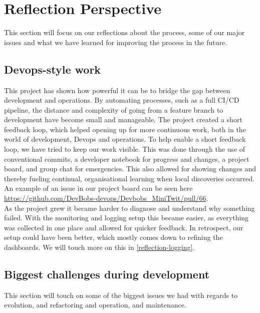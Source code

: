 \section{Reflection Perspective}\label{reflection-perspective}

This section will focus on our reflections about the process, some of
our major issues and what we have learned for improving the process in
the future.

\subsection{Devops-style work}
This project has shown how powerful it can be to bridge the gap between development and operations.
By automating processes, such as a full CI/CD pipeline, the distance and complexity of going from a feature branch to development have become small and manageable.
The project created a short feedback loop, which helped opening up for more continuous work, both in the world of development, Devops and operations.
To help enable a short feedback loop, we have tried to keep our work visible. 
This was done through the use of conventional commits, a developer notebook for progress and changes, a project board, and group chat for emergencies.
This also allowed for showing changes and thereby fueling continual, organisational learning when local discoveries occurred. 
An example of an issue in our project board can be seen here \url{https://github.com/DevBobs-devops/Devbobs_MiniTwit/pull/66}. \\

As the project grew it became harder to diagnose and understand why something failed.
With the monitoring and logging setup this became easier, as everything was collected in one place and allowed for quicker feedback. 
In retrospect, our setup could have been better, which mostly comes down to refining the dashboards.
We will touch more on this in \ref{reflection-logging}.



\subsection{Biggest challenges during
development}\label{biggest-issues-during-development}
This section will touch on some of the biggest issues we had with regards to evolution, and refactoring and operation, and maintenance.
